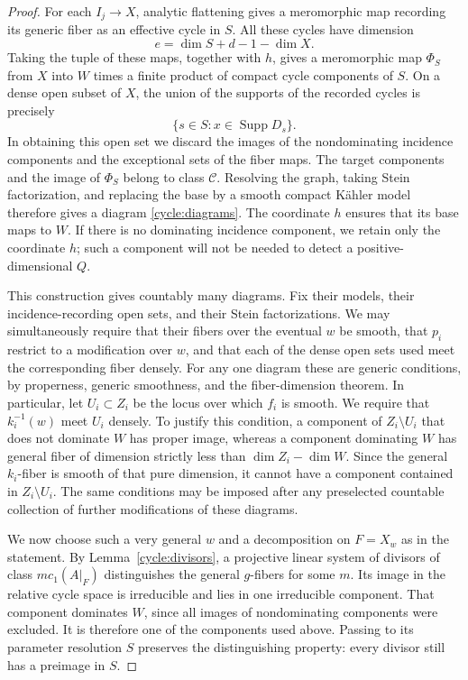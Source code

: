 \begin{proof}
For each $I_j\to X$, analytic flattening gives a meromorphic map
recording its generic fiber as an effective cycle in $S$.  All these
cycles have dimension
\[
                         e=\dim S+d-1-\dim X.
\]
Taking the tuple of these maps, together with $h$, gives a meromorphic
map $\Phi_S$ from $X$ into $W$ times a finite product of compact cycle
components of $S$.  On a dense open subset of $X$, the union of the
supports of the recorded cycles is precisely
\begin{equation}\label{cycle:incidence-support}
                         \{s\in S:x\in\operatorname{Supp}D_s\}.
\end{equation}
In obtaining this open set we discard the images of the nondominating
incidence components and the exceptional sets of the fiber maps.
The target components and the image of $\Phi_S$ belong to class
$\mathcal C$.  Resolving the graph, taking Stein factorization, and
replacing the base by a smooth compact K\"ahler model therefore gives
a diagram \eqref{cycle:diagrams}.  The coordinate $h$ ensures that its
base maps to $W$.  If there is no dominating incidence component, we
retain only the coordinate $h$; such a component will not be needed
to detect a positive-dimensional $Q$.

This construction gives countably many diagrams.  Fix their models,
their incidence-recording open sets, and their Stein factorizations.
We may simultaneously require that their fibers over the eventual
$w$ be smooth, that $p_i$ restrict to a modification over $w$, and that
each of the dense open sets used meet the corresponding fiber densely.
For any one diagram these are generic conditions, by properness,
generic smoothness, and the fiber-dimension theorem.  In particular,
let $U_i\subset Z_i$ be the locus over which $f_i$ is smooth.  We
require that $k_i^{-1}(w)$ meet $U_i$ densely.  To justify this
condition, a component of $Z_i\setminus U_i$ that does not dominate
$W$ has proper image, whereas a component dominating $W$ has general
fiber of dimension strictly less than $\dim Z_i-\dim W$.
Since the general $k_i$-fiber is smooth of that pure dimension, it
cannot have a component contained in $Z_i\setminus U_i$.  The same
conditions may be imposed after any preselected countable collection
of further modifications of these diagrams.

We now choose such a very general $w$ and a decomposition on $F=X_w$
as in the statement.  By Lemma~\ref{cycle:divisors}, a projective
linear system of divisors of class $m c_1(A|_F)$ distinguishes the
general $g$-fibers for some $m$.  Its image in the relative cycle
space is irreducible and lies in one irreducible component.  That
component dominates $W$, since all images of nondominating components
were excluded.  It is therefore one of the components used above.
Passing to its parameter resolution $S$ preserves the distinguishing
property: every divisor still has a preimage in $S$.


\end{proof}
